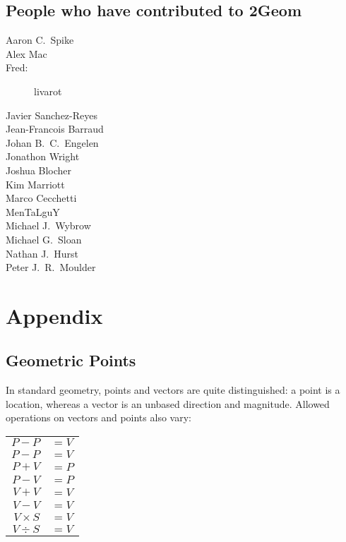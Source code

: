 \documentclass[openany]{book}
\begin{document}
\section{People who have contributed to 2Geom}
\begin{description}
\item[Aaron C.\ Spike]
\item[Alex Mac]
\item[Fred:] livarot
\item[Javier Sanchez-Reyes]
\item[Jean-Francois Barraud]
\item[Johan B.\ C.\ Engelen]
\item[Jonathon Wright]
\item[Joshua Blocher]
\item[Kim Marriott]
\item[Marco Cecchetti]
\item[MenTaLguY]
\item[Michael J.\ Wybrow]
\item[Michael G.\ Sloan]
\item[Nathan J.\ Hurst]
\item[Peter J.\ R.\ Moulder]
\end{description}

\chapter{Appendix}
\renewcommand{\thesection}{\Alph{section}}

\section{Geometric Points}
In standard geometry, points and vectors are quite distinguished: a
point is a location, whereas a vector is an unbased direction and
magnitude.  Allowed operations on vectors and points also vary:

\begin{tabular}{r l}
  $P - P$ & $= V$ \\

  $P - P$ & $= V$ \\

  $P + V$ & $= P$ \\

  $P - V$ & $= P$ \\

  $V + V$ & $= V$ \\

  $V - V$ & $= V$ \\

  $V \times S$ & $= V$ \\

  $V \div S$ & $= V$ \\
\end{tabular}
\end{document}
